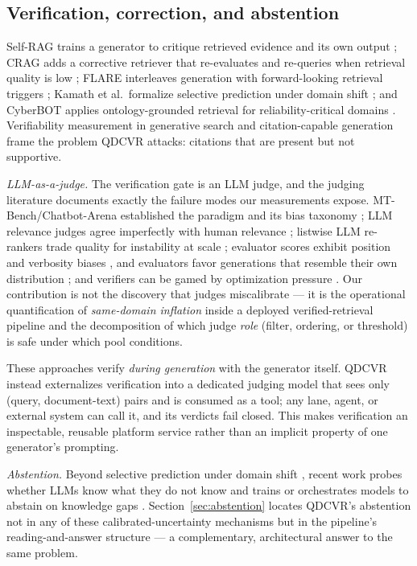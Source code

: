 \subsection{Verification, correction, and abstention}
Self-RAG trains a generator to critique retrieved evidence and its own output
\cite{selfrag}; CRAG adds a corrective retriever that re-evaluates and
re-queries when retrieval quality is low \cite{crag}; FLARE interleaves
generation with forward-looking retrieval triggers \cite{flare}; Kamath et
al.\ formalize selective prediction under domain shift \cite{kamath}; and
CyberBOT applies ontology-grounded retrieval for reliability-critical
domains \cite{cyberbot}. Verifiability measurement in generative search
\cite{liu-verifiability} and citation-capable generation \cite{gao-citations}
frame the problem QDCVR attacks: citations that are present but not
supportive.

\emph{LLM-as-a-judge.} The verification gate is an LLM judge, and the
judging literature documents exactly the failure modes our measurements
expose. MT-Bench/Chatbot-Arena established the paradigm and its bias
taxonomy \cite{zheng-llmjudge}; LLM relevance judges agree imperfectly with
human relevance \cite{sun-urara}; listwise LLM re-rankers trade quality for
instability at scale \cite{rankgpt}; evaluator scores exhibit position and
verbosity biases \cite{zheng-llmjudge}, and evaluators favor generations
that resemble their own distribution \cite{panickssery-selfpref};
and verifiers can be gamed by optimization pressure \cite{lightman-verify}.
Our contribution is not the discovery that judges miscalibrate --- it is the
operational quantification of \emph{same-domain inflation} inside a deployed
verified-retrieval pipeline and the decomposition of which judge \emph{role}
(filter, ordering, or threshold) is safe under which pool conditions.

These approaches verify \emph{during generation} with the generator itself.
QDCVR instead externalizes verification into a dedicated judging model that
sees only (query, document-text) pairs and is consumed as a tool; any lane,
agent, or external system can call it, and its verdicts fail closed. This
makes verification an inspectable, reusable platform service rather than an
implicit property of one generator's prompting.

\emph{Abstention.} Beyond selective prediction under domain shift
\cite{kamath}, recent work probes whether LLMs know what they do not know
\cite{yin-knowwhat} and trains or orchestrates models to abstain on
knowledge gaps \cite{feng-abstain}. Section~\ref{sec:abstention} locates
QDCVR's abstention not in any of these calibrated-uncertainty mechanisms
but in the pipeline's reading-and-answer structure --- a complementary,
architectural answer to the same problem.


